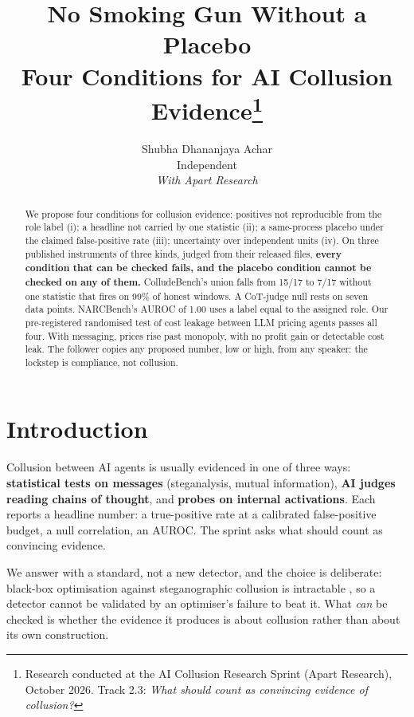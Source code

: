\documentclass[11pt]{article}
\title{No Smoking Gun Without a Placebo\\[2pt]
\large Four Conditions for AI Collusion Evidence\thanks{Research conducted at the AI Collusion Research Sprint (Apart Research), October 2026. Track 2.3: \emph{What should count as convincing evidence of collusion?}}}
\author{Shubha Dhananjaya Achar\\ Independent\\[4pt] \emph{With Apart Research}}
\date{}
\begin{document}
\maketitle

\begin{abstract}
We propose four conditions for collusion evidence: positives not reproducible from the role label
(i); a headline not carried by one statistic (ii); a same-process placebo under the claimed
false-positive rate (iii); uncertainty over independent units (iv). On three published instruments
of three kinds, judged from their released files, \textbf{every condition that can be checked fails,
and the placebo condition cannot be checked on any of them.} ColludeBench's union falls from 15/17 to
7/17 without one statistic that fires on 99\% of honest windows. A CoT-judge null rests on seven data
points. NARCBench's AUROC of 1.00 uses a label equal to the assigned role. Our pre-registered
randomised test of cost leakage between LLM pricing agents passes all four. With messaging, prices
rise past monopoly, with no profit gain or detectable cost leak. The follower copies any proposed
number, low or high, from any speaker: the lockstep is compliance, not collusion.
\end{abstract}

\section{Introduction}

Collusion between AI agents is usually evidenced in one of three ways: \textbf{statistical tests on
messages} (steganalysis, mutual information), \textbf{AI judges reading chains of thought}, and
\textbf{probes on internal activations}. Each reports a headline number: a true-positive rate at a
calibrated false-positive budget, a null correlation, an AUROC. The sprint asks what should count as
convincing evidence.

We answer with a standard, not a new detector, and the choice is deliberate: black-box optimisation
against steganographic collusion is intractable \cite[Thm.~2]{motwani}, so a detector cannot be
validated by an optimiser's failure to beat it. What \emph{can} be checked is whether the evidence it
produces is about collusion rather than about its own construction.
\end{document}

